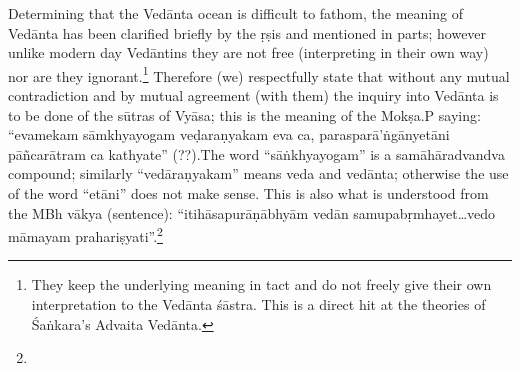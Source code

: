 Determining that the Vedānta ocean is difficult to fathom, the meaning of Vedānta has been clarified briefly by the ṛṣis and mentioned in parts; however unlike modern day Vedāntins they are not free (interpreting in their own way) nor are they ignorant.\footnote{They keep the underlying meaning in tact and do not freely give their own interpretation to the Vedānta śāstra. This is a direct hit at the theories of Śaṅkara’s Advaita Vedānta.} Therefore (we) respectfully state that without any mutual contradiction and by mutual agreement (with them) the inquiry into Vedānta is to be done of the sūtras of Vyāsa; this is the meaning of the Mokṣa.P saying: “evamekam sāmkhyayogam veḍaraṇyakam eva ca, parasparā’ṅgānyetāni pāñcarātram ca kathyate” (??).The word “sāṅkhyayogam” is a samāhāradvan\-dva compound; similarly “vedāraṇyakam” means veda and vedānta; otherwise the use of the word “etāni” does not make sense. This is also what is understood from the MBh vākya (sentence): “itihāsapurāṇābhyām vedān samupabṛmhayet…vedo māmayam prahariṣyati”.\footnote{}

